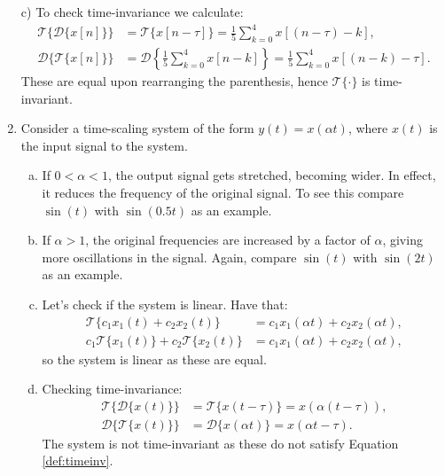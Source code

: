 \begin{enumerate}
  \item[c)] To check time-invariance we calculate:
        \begin{align*}
          \mathcal{T}\{\mathcal{D}\{x[n]\}\} & =\mathcal{T}\{x[n-\tau]\}=\frac{1}{5}\sum_{k=0}^{4}x[(n-\tau)-k],                                  \\
          \mathcal{D}\{\mathcal{T}\{x[n]\}\} & =\mathcal{D}\left\{\frac{1}{5}\sum_{k=0}^{4}x[n-k]\right\}=\frac{1}{5}\sum_{k=0}^{4}x[(n-k)-\tau].
        \end{align*}
        These are equal upon rearranging the parenthesis, hence $\mathcal{T}\{\cdot\}$ is time-invariant.

  \item Consider a time-scaling system of the form $y(t)=x(\alpha t)$, where $x(t)$ is the input signal to the system.

        \begin{enumerate}[a)]
          \item If $0<\alpha<1$, the output signal gets stretched, becoming wider. In effect, it reduces the frequency of the original signal.
                To see this compare $\sin(t)$ with $\sin(0.5t)$ as an example.

          \item If $\alpha>1$, the original frequencies are increased by a factor of $\alpha$, giving more oscillations in the signal.
                Again, compare $\sin(t)$ with $\sin(2t)$ as an example.

          \item Let's check if the system is linear. Have that:
                \begin{align*}
                  \mathcal{T}\{c_{1}x_{1}(t)+c_{2}x_{2}(t)\}                & = c_{1}x_{1}(\alpha t) + c_{2}x_{2}(\alpha t), \\
                  c_{1}\mathcal{T}\{x_{1}(t)\}+c_{2}\mathcal{T}\{x_{2}(t)\} & =c_{1}x_{1}(\alpha t)+c_{2}x_{2}(\alpha t),
                \end{align*}
                so the system is linear as these are equal.

          \item Checking time-invariance:
                \begin{align*}
                  \mathcal{T}\{\mathcal{D}\{x(t)\}\} & =\mathcal{T}\{x(t-\tau)\}=x(\alpha(t-\tau)),  \\
                  \mathcal{D}\{\mathcal{T}\{x(t)\}\} & =\mathcal{D}\{x(\alpha t)\}=x(\alpha t-\tau).
                \end{align*}
                The system is not time-invariant as these do not satisfy Equation \ref{def:timeinv}.
        \end{enumerate}


\end{enumerate}

